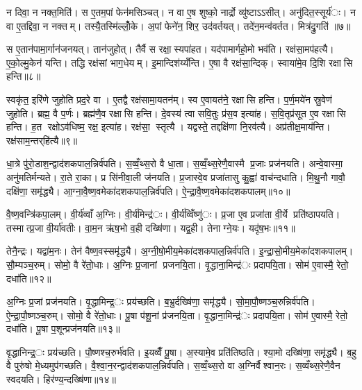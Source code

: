 न दिवा॒ न नक्त॒मिति॑। स ए॒तम॒पां फेन॑मसिञ्चत्। न वा ए॒ष शुष्को॒ नार्द्रो व्यु॑ष्टाऽऽसीत्। अनु॑दित॒स्सूर्य॑ः। न वा ए॒तद्दिवा॒ न नक्तम्। तस्यै॒तस्मि॑ल्लोँ॒के। अ॒पां फेने॑न॒ शिर॒ उद॑वर्तयत्। तदे॑न॒मन्व॑वर्तत। मित्र॑द्रु॒गति॑ ॥७॥

स ए॒तान॑पामा॒र्गान॑जनयत्। तान॑जुहोत्। तैर्वै स रक्षा॒स्यपा॑हत। यद॑पामार्गहो॒मो भव॑ति। रक्ष॑सा॒मप॑हत्यै। ए॒को॒ल्मु॒केन॑ यन्ति। तद्धि रक्ष॑सां भाग॒धेयम्। इ॒मान्दिश॑य्यँन्ति। ए॒षा वै रक्ष॑सा॒न्दिक्। स्वाया॑मे॒व दि॒शि रक्षासि हन्ति॥८॥

स्वकृ॑त॒ इरि॑णे जुहोति प्रद॒रे वा। ए॒तद्वै रक्ष॑सामा॒यतन॑म्। स्व ए॒वायत॑ने॒ रक्षासि हन्ति। प॒र्ण॒मये॑न स्रु॒वेण॑ जुहोति। ब्रह्म॒ वै प॒र्णः। ब्रह्म॑णै॒व रक्षासि हन्ति। दे॒वस्य॑ त्वा सवि॒तुः प्र॑स॒व इत्या॑ह। स॒वि॒तृप्र॑सूत ए॒व रक्षासि हन्ति। ह॒त रक्षोऽव॑धिष्म॒ रक्ष॒ इत्या॑ह। रक्ष॑सा॒ स्तृत्यै। यद्वस्ते॒ तद्दक्षि॑णा नि॒रव॑त्यै। अप्र॑तीक्ष॒माय॑न्ति। रक्ष॑साम॒न्तर्‌हि॑त्यै॥९॥


धा॒त्रे पु॑रो॒डाश॒न्द्वाद॑शकपाल॒न्निर्व॑पति। स॒व्वँ॒थ्स॒रो वै धा॒ता। स॒व्वँ॒थ्स॒रेणै॒वास्मै प्र॒जाः प्रज॑नयति। अन्वे॒वास्मा॒ अनु॑मतिर्मन्यते। रा॒ते रा॒का। प्र सि॑नीवा॒ली ज॑नयति। प्र॒जास्वे॒व प्रजा॑तासु कु॒ह्वा॑ वाच॑न्दधाति। मि॒थु॒नौ गावौ॒ दक्षि॑णा॒ समृ॑द्ध्यै। आ॒ग्ना॒वै॒ष्ण॒वमेका॑दशकपाल॒न्निर्व॑पति। ऐ॒न्द्रा॒वै॒ष्ण॒वमेका॑दशकपालम्॥१०॥

वै॒ष्ण॒वन्त्रि॑कपा॒लम्। वी॒र्य॑व्वाँ अ॒ग्निः। वी॒र्य॑मिन्द्र॑ः। वी॒र्य॑व्विँष्णु॑ः। प्र॒जा ए॒व प्रजा॑ता वी॒र्ये प्रति॑ष्ठापयति। तस्मात्प्र॒जा वी॒र्या॑वतीः। वा॒म॒न ऋ॑ष॒भो व॒ही दख्षि॑णा। यद्व॒ही। तेनाग्ने॒यः। यदृ॑ष॒भः॥११॥

तेनै॒न्द्रः। यद्वा॑म॒नः। तेन॑ वैष्ण॒वस्समृ॑द्ध्यै। अ॒ग्नी॒षो॒मीय॒मेका॑दशकपाल॒न्निर्व॑पति। इ॒न्द्रा॒सो॒मीय॒मेका॑दशकपालम्। सौ॒म्यञ्च॒रुम्। सोमो॒ वै रे॑तो॒धाः। अ॒ग्निः प्र॒जानां प्रजनयि॒ता। वृ॒द्धाना॒मिन्द्र॑ः प्रदापयि॒ता। सोम॑ ए॒वास्मै॒ रेतो॒ दधा॑ति॥१२॥

अ॒ग्निः प्र॒जां प्रज॑नयति। वृ॒द्धामिन्द्र॒ः प्रय॑च्छति। ब॒भ्रुर्दख्षि॑णा॒ समृ॑द्ध्यै। सो॒मा॒पौ॒ष्णञ्च॒रुन्निर्व॑पति। ऐ॒न्द्रा॒पौ॒ष्णञ्च॒रुम्। सोमो॒ वै रे॑तो॒धाः। पू॒षा प॑शू॒नां प्र॑जनयि॒ता। वृ॒द्धाना॒मिन्द्र॑ः प्रदापयि॒ता। सोम॑ ए॒वास्मै॒ रेतो॒ दधा॑ति। पू॒षा प॒शून्प्रज॑नयति॥१३॥

वृ॒द्धानिन्द्र॒ः प्रय॑च्छति। पौ॒ष्णश्च॒रुर्भ॑वति। इ॒यव्वैँ पू॒षा। अ॒स्यामे॒व प्रति॑तिष्ठति। श्या॒मो दख्षि॑णा॒ समृ॑द्ध्यै। ब॒हु वै पुरु॑षो मे॒ध्यमुप॑गच्छति। वै॒श्वा॒न॒रन्द्वाद॑शकपाल॒न्निर्व॑पति। स॒व्वँ॒थ्स॒रो वा अ॒ग्निर्वैश्वान॒रः। स॒व्वँथ्स॒रेणै॒वैन स्वदयति। हिर॑ण्य॒न्दख्षि॑णा॥१४॥

